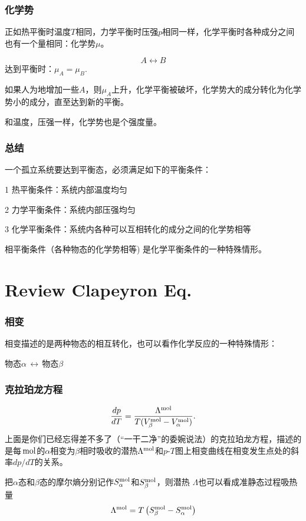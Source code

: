 \documentclass[CJK,13pt]{beamer}
\begin{document}
\begin{frame}
  \frametitle{化学势}

  正如热平衡时温度$T$相同，力学平衡时压强$p$相同一样，化学平衡时各种成分之间也有一个量相同：{\blue 化学势$\mu$}。
  
  $$A\leftrightarrow B$$
  达到平衡时：$\mu_A = \mu_B.$

    \skipline

  如果人为地增加一些$A$，则$\mu_A$上升，化学平衡被破坏，化学势大的成分转化为化学势小的成分，直至达到新的平衡。

  \skipline
  
  和温度，压强一样，{\blue 化学势也是个强度量}。

\end{frame}


\begin{frame}
\frametitle{总结}

一个孤立系统要达到平衡态，必须满足如下的平衡条件：
\bitem
\item[1]{\blue 热平衡条件：系统内部温度均匀}
\item[2]{\blue 力学平衡条件：系统内部压强均匀}
\item[3]{\blue 化学平衡条件：系统内各种可以互相转化的成分之间的化学势相等}
\eitem

相平衡条件（各种物态的化学势相等) 是化学平衡条件的一种特殊情形。

\end{frame}



\section{Review Clapeyron Eq.}

\begin{frame}
  \frametitle{相变}
  相变描述的是两种物态的相互转化，也可以看作化学反应的一种特殊情形：

  \bcenter
  物态$\alpha\, \leftrightarrow\,$物态$\beta$
  
  \ecenter
\end{frame}


\begin{frame}
  \frametitle{克拉珀龙方程}
  $$ \frac{dp}{dT} = \frac{\Lambda^{\rm mol}}{T(V_\beta^{\rm mol} - V_\alpha^{\rm mol})}. $$
  上面是你们已经忘得差不多了（“一干二净”的委婉说法）的{\blue 克拉珀龙方程}，描述的是每$\,\mathrm{mol}$的$\alpha$相变为$\beta$相时吸收的潜热$\Lambda^{\rm mol}$和$p$-$T$图上相变曲线在相变发生点处的斜率$dp/dT$的关系。

  \skipline

  把$\alpha$态和$\beta$态的摩尔熵分别记作$S_\alpha^{\rm mol}$和$S_\beta^{\rm mol}$，则潜热 $\Lambda$也可以看成准静态过程吸热量
  $$\Lambda^{\rm mol} = T\left(S_\beta^{\rm mol} - S_\alpha^{\rm mol}\right)$$
  
\end{frame}
\end{document}
